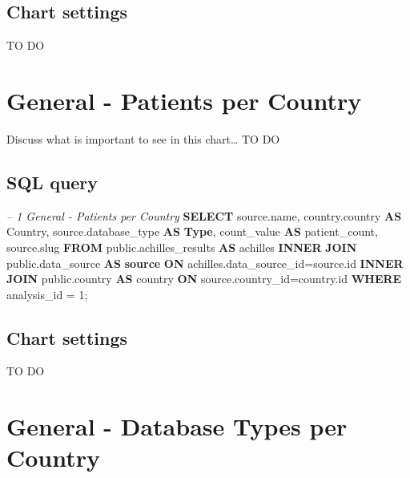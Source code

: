 \documentclass[]{book}
\newenvironment{Shaded}{\begin{snugshade}}{\end{snugshade}}
\newcommand{\KeywordTok}[1]{\textcolor[rgb]{0.13,0.29,0.53}{\textbf{#1}}}
\newcommand{\DecValTok}[1]{\textcolor[rgb]{0.00,0.00,0.81}{#1}}
\newcommand{\CommentTok}[1]{\textcolor[rgb]{0.56,0.35,0.01}{\textit{#1}}}
\newcommand{\NormalTok}[1]{#1}
\begin{document}
\subsection{Chart settings}\label{chart-settings-4}

TO DO

\section{General - Patients per
Country}\label{general---patients-per-country}

Discuss what is important to see in this chart\ldots{} TO DO

\subsection{SQL query}\label{sql-query-5}

\begin{Shaded}
\begin{Highlighting}[]
\CommentTok{-- 1    General - Patients per Country}
\KeywordTok{SELECT}\NormalTok{ source.name,}
\NormalTok{       country.country }\KeywordTok{AS}\NormalTok{ Country,}
\NormalTok{       source.database_type }\KeywordTok{AS} \KeywordTok{Type}\NormalTok{,}
\NormalTok{       count_value }\KeywordTok{AS}\NormalTok{ patient_count,}
\NormalTok{       source.slug}
\KeywordTok{FROM}\NormalTok{ public.achilles_results }\KeywordTok{AS}\NormalTok{ achilles }\KeywordTok{INNER} \KeywordTok{JOIN} 
\NormalTok{    public.data_source }\KeywordTok{AS} \KeywordTok{source} \KeywordTok{ON}\NormalTok{ achilles.data_source_id=source.id}
    \KeywordTok{INNER} \KeywordTok{JOIN}\NormalTok{ public.country }\KeywordTok{AS}\NormalTok{ country }\KeywordTok{ON} 
\NormalTok{    source.country_id=country.id}
\KeywordTok{WHERE}\NormalTok{ analysis_id = }\DecValTok{1}\NormalTok{;}
\end{Highlighting}
\end{Shaded}

\subsection{Chart settings}\label{chart-settings-5}

TO DO

\section{General - Database Types per
Country}\label{general---database-types-per-country}
\end{document}
